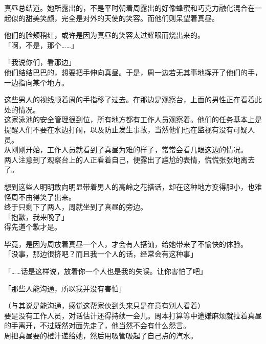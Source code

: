 真昼总结道。她所露出的，不是平时朝着周露出的好像蜂蜜和巧克力融化混合在一起似的甜美笑颜，完全是对外的天使的笑容。而他们则呆望着真昼。

他们的脸颊稍红，或许是因为真昼的笑容太过耀眼而烧出来的。\\

「啊，不是，那个……」

「我说你们，看那边」\\

他们结结巴巴的，想要把手伸向真昼。于是，周一边若无其事地挥开了他们的手，一边指向某个地方。

这些男人的视线顺着周的手指移了过去。在那边是观察台，上面的男性正在看着此处的情况。\\

这家泳池的安全管理很到位，所有地方都有工作人员观察着。他们的任务基本上是提醒人们不要在水边打闹，以及防止发生事故，当然他们也在监视有没有可疑人员。\\

从刚刚开始，工作人员就看到了真昼为难的样子，常常会看几眼这边的情况。\\

两人注意到了观察台上的人正看着自己，便露出了尴尬的表情，慌慌张张地离去了。

想到这些人明明敢向明显带着男人的高岭之花搭话，却在这种地方变得胆小，也难怪周不由得笑了出来。\\

终于只剩下了两人，周就坐到了真昼的旁边。\\

「抱歉，我来晚了」\\

得先道个歉才是。

毕竟，是因为周放着真昼一个人，才会有人搭讪，给她带来了不愉快的体验。\\

「没事，那边很挤吧？而且我一个人的话，经常会有这种事」

「……话是这样说，放着你一个人也是我的失误。让你害怕了吧」

「那些人能沟通，所以我并没有害怕」

（与其说是能沟通，感觉这帮家伙到头来只是在意有别人看着）\\

要是没有工作人员，对话估计还得持续一会儿。周本打算等中途嫌麻烦就拉着真昼的手离开，不过既然对面先走了，他当然不会有什么怨言。\\

周把真昼要的橙汁递给她，然后用吸管吸起了自己点的汽水。\\

